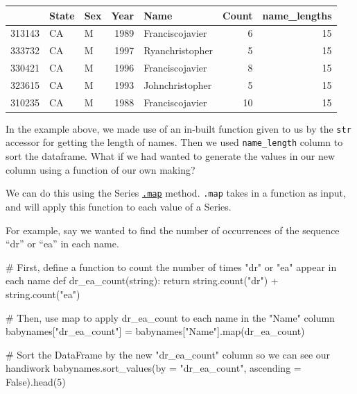 \documentclass[
  letterpaper,
  DIV=11,
  numbers=noendperiod]{scrreprt}
\newenvironment{Shaded}{\begin{snugshade}}{\end{snugshade}}
\newcommand{\BuiltInTok}[1]{\textcolor[rgb]{0.00,0.23,0.31}{#1}}
\newcommand{\CommentTok}[1]{\textcolor[rgb]{0.37,0.37,0.37}{#1}}
\newcommand{\ControlFlowTok}[1]{\textcolor[rgb]{0.00,0.23,0.31}{#1}}
\newcommand{\DecValTok}[1]{\textcolor[rgb]{0.68,0.00,0.00}{#1}}
\newcommand{\KeywordTok}[1]{\textcolor[rgb]{0.00,0.23,0.31}{#1}}
\newcommand{\NormalTok}[1]{\textcolor[rgb]{0.00,0.23,0.31}{#1}}
\newcommand{\OperatorTok}[1]{\textcolor[rgb]{0.37,0.37,0.37}{#1}}
\newcommand{\StringTok}[1]{\textcolor[rgb]{0.13,0.47,0.30}{#1}}
\newcommand{\VariableTok}[1]{\textcolor[rgb]{0.07,0.07,0.07}{#1}}
\begin{document}
\begin{tabular}{lllrlrr}
\toprule
{} & State & Sex &  Year &             Name &  Count &  name\_lengths \\
\midrule
313143 &    CA &   M &  1989 &  Franciscojavier &      6 &            15 \\
333732 &    CA &   M &  1997 &  Ryanchristopher &      5 &            15 \\
330421 &    CA &   M &  1996 &  Franciscojavier &      8 &            15 \\
323615 &    CA &   M &  1993 &  Johnchristopher &      5 &            15 \\
310235 &    CA &   M &  1988 &  Franciscojavier &     10 &            15 \\
\bottomrule
\end{tabular}

In the example above, we made use of an in-built function given to us by
the \texttt{str} accessor for getting the length of names. Then we used
\texttt{name\_length} column to sort the dataframe. What if we had
wanted to generate the values in our new column using a function of our
own making?

We can do this using the Series
\href{https://pandas.pydata.org/docs/reference/api/pandas.Series.map.html}{\texttt{.map}}
method. \texttt{.map} takes in a function as input, and will apply this
function to each value of a Series.

For example, say we wanted to find the number of occurrences of the
sequence ``dr'' or ``ea'' in each name.

\begin{Shaded}
\begin{Highlighting}[]
\CommentTok{\# First, define a function to count the number of times "dr" or "ea" appear in each name}
\KeywordTok{def}\NormalTok{ dr\_ea\_count(string):}
    \ControlFlowTok{return}\NormalTok{ string.count(}\StringTok{"dr"}\NormalTok{) }\OperatorTok{+}\NormalTok{ string.count(}\StringTok{"ea"}\NormalTok{)}

\CommentTok{\# Then, use \textasciigrave{}map\textasciigrave{} to apply \textasciigrave{}dr\_ea\_count\textasciigrave{} to each name in the "Name" column}
\NormalTok{babynames[}\StringTok{"dr\_ea\_count"}\NormalTok{] }\OperatorTok{=}\NormalTok{ babynames[}\StringTok{"Name"}\NormalTok{].}\BuiltInTok{map}\NormalTok{(dr\_ea\_count)}

\CommentTok{\# Sort the DataFrame by the new "dr\_ea\_count" column so we can see our handiwork}
\NormalTok{babynames.sort\_values(by }\OperatorTok{=} \StringTok{"dr\_ea\_count"}\NormalTok{, ascending }\OperatorTok{=} \VariableTok{False}\NormalTok{).head(}\DecValTok{5}\NormalTok{)}
\end{Highlighting}
\end{Shaded}
\end{document}
